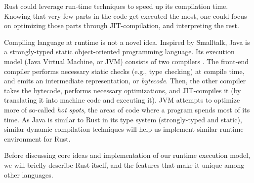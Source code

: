 Rust could leverage run-time techniques to speed up its compilation time.
Knowing that very few parts in the code get executed the most, one could
focus on optimizing those parts through JIT-compilation, and interpreting the
rest.

Compiling language at runtime is not a novel idea.  Inspired by Smalltalk, Java
is a strongly-typed static object-oriented programming language.  Its execution
model (Java Virtual Machine, or JVM) consists of two compilers \cite{javajvm}.
The front-end compiler performs necessary static checks (e.g., type checking)
at compile time, and emits an intermediate representation, or
\textit{bytecode}.  Then, the other compiler takes the bytecode, performs
necessary optimizations, and JIT-compiles it (by translating it into machine
code and executing it). JVM attempts to optimize more of so-called \textit{hot
spots}, the areas of code where a program spends most of its time. As Java is
similar to Rust in its type system (strongly-typed and static), similar dynamic
compilation techniques will help us implement similar runtime environment for
Rust.

Before discussing core ideas and implementation of our runtime
execution model, we will briefly describe Rust itself, and the features
that make it unique among other languages.
